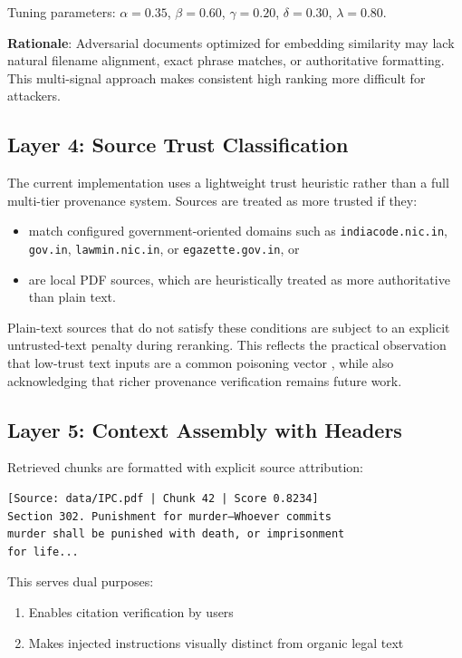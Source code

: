 \documentclass[conference]{IEEEtran}
\begin{document}
Tuning parameters: $\alpha=0.35$, $\beta=0.60$, $\gamma=0.20$, $\delta=0.30$, $\lambda=0.80$.

\textbf{Rationale}: Adversarial documents optimized for embedding similarity may lack natural filename alignment, exact phrase matches, or authoritative formatting. This multi-signal approach makes consistent high ranking more difficult for attackers.

\subsection{Layer 4: Source Trust Classification}

The current implementation uses a lightweight trust heuristic rather than a full multi-tier provenance system. Sources are treated as more trusted if they:
\begin{itemize}
    \item match configured government-oriented domains such as \texttt{indiacode.nic.in}, \texttt{gov.in}, \texttt{lawmin.nic.in}, or \texttt{egazette.gov.in}, or
    \item are local PDF sources, which are heuristically treated as more authoritative than plain text.
\end{itemize}

Plain-text sources that do not satisfy these conditions are subject to an explicit untrusted-text penalty during reranking. This reflects the practical observation that low-trust text inputs are a common poisoning vector \cite{b2}, while also acknowledging that richer provenance verification remains future work.

\subsection{Layer 5: Context Assembly with Headers}

Retrieved chunks are formatted with explicit source attribution:

\begin{verbatim}
[Source: data/IPC.pdf | Chunk 42 | Score 0.8234]
Section 302. Punishment for murder—Whoever commits
murder shall be punished with death, or imprisonment
for life...
\end{verbatim}

This serves dual purposes:
\begin{enumerate}
    \item Enables citation verification by users
    \item Makes injected instructions visually distinct from organic legal text
\end{enumerate}
\end{document}
